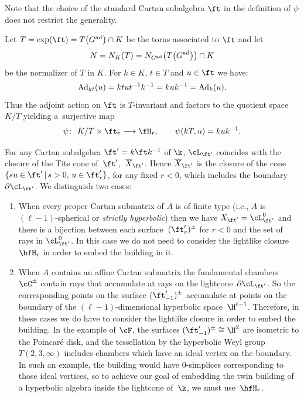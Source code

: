 Note that the choice of the standard Cartan subalgebra $\ft$ in the definition of $\psi$ does not restrict the generality.

Let $T = \exp(\ft) = T\big(G^{\rm ad}\big)\cap K$ be the torus associated to $\ft$ and let
\[N = N_K(T) = N_{G^{\rm ad}}\big(T\big(G^{\rm ad}\big)\big)\cap K\]
be the normalizer of $T$ in $K$. For $k\in K$, $t\in T$ and $u\in \ft$ we have:
\[{\rm Ad}_{kt} (u) = ktut^{-1}k^{-1} = kuk^{-1}={\rm Ad}_k(u).\]
Thus the adjoint action on $\ft$ is $T$-invariant and factors to the quotient space $K/T$ yielding a~surjective map
\begin{displaymath}
\psi\colon \ K/T\times \ft_r\longrightarrow \fH_{r},\qquad \psi(kT,u) = kuk^{-1}.
\end{displaymath}

For any Cartan subalgebra $\ft' = k\ft k^{-1}$ of $\k$, $\cL_{\ft'}$ coincides with the closure of the Tits cone of~$\ft'$,~${\overline X}_{\ft'}$. Hence ${\overline X}_{\ft'}$ is the closure of the cone $\{su \in \ft' \, |\, s>0, \, u\in \ft'_r \}$, for any fixed $r<0$, which includes the boundary
$\partial\cL_{\ft'}$. We distinguish two cases:
\begin{enumerate}\itemsep=0pt
\item When every proper Cartan submatrix of $A$ is of finite type (i.e., $A$ is $(\ell-1)$-spherical or {\em strictly hyperbolic}) then we have $X_{\ft'} = \cL_{\ft'}^0$ and there is a bijection between each surface~$(\ft'_r)^\pm$ for $r<0$ and the set of rays in $\cL_{\ft'}^0$. In this case
we do not need to consider the lightlike closure $\hfH_r$ in order to embed the building in it.
\item When $A$ contains an affine Cartan submatrix the fundamental chambers $\cC^\pm$ contain rays that accumulate at rays on the lightcone~$\partial\cL_{\ft'}$. So the corresponding points on the surface $(\ft'_{-1})^\pm$ accumulate at points on the boundary of the
$(\ell-1)$-dimensional hyperbolic space~$\H^{\ell-1}$. Therefore, in these cases we do have to consider the lightlike closure in order to
embed the building. In the example of $\cF$, the surfaces $(\ft'_{-1})^\pm\cong\H^2$ are isometric to
the Poincar\'e disk, and the tessellation by the hyperbolic Weyl group~$T(2,3,\infty)$ includes chambers which have an ideal vertex on the boundary. In such an example, the building would have $0$-simplices corresponding to those ideal vertices, so to achieve our goal of embedding the twin building of a hyperbolic algebra inside the lightcone of~$\k$, we must use~$\hfH_r$.
\end{enumerate}

